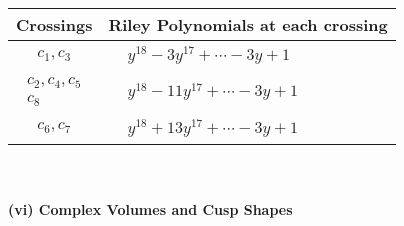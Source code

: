 \documentclass[1p]{elsarticle_modified}
\theoremstyle{definition}
\begin{document}
\begin{tabular}{m{50pt}|m{274pt}}
Crossings & \hspace{64pt}Riley Polynomials at each crossing \\
\hline $$\begin{aligned}c_{1},c_{3}\end{aligned}$$&$\begin{aligned}
&y^{18}-3 y^{17}+\cdots-3 y+1
\end{aligned}$\\
\hline $$\begin{aligned}c_{2},c_{4},c_{5}\\c_{8}\end{aligned}$$&$\begin{aligned}
&y^{18}-11 y^{17}+\cdots-3 y+1
\end{aligned}$\\
\hline $$\begin{aligned}c_{6},c_{7}\end{aligned}$$&$\begin{aligned}
&y^{18}+13 y^{17}+\cdots-3 y+1
\end{aligned}$\\
\hline
\end{tabular}\\~\\
\newpage\flushleft \textbf{(vi) Complex Volumes and Cusp Shapes}
\end{document}
